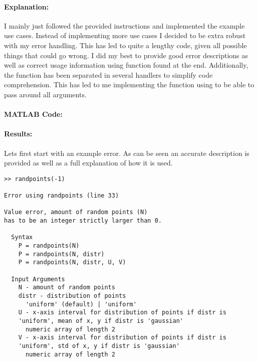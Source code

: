 
\paragraph{Explanation:}
I mainly just followed the provided instructions and implemented the example use cases.
Instead of implementing more use cases I decided to be extra robust with my error handling.
This has led to quite a lengthy code, given all possible things that could go wrong.
I did my best to provide good error descriptions as well as correct usage information using function  found at the end.
Additionally, the function has been separated in several handlers to simplify code comprehension.
This has led to me implementing the function using  to be able to pass around all arguments.

\paragraph{MATLAB Code:}

\begin{tiny}
    
\end{tiny}

\paragraph{Results:}
Lets first start with an example error.
As can be seen an accurate description is provided as well as a full explanation of how it is used.

\begin{verbatim}
>> randpoints(-1)

Error using randpoints (line 33)

Value error, amount of random points (N)
has to be an integer strictly larger than 0.

  Syntax
	P = randpoints(N)
	P = randpoints(N, distr)
	P = randpoints(N, distr, U, V)

  Input Arguments
	N - amount of random points
	distr - distribution of points
	  'uniform' (default) | 'uniform'
	U - x-axis interval for distribution of points if distr is
	'uniform', mean of x, y if distr is 'gaussian'
	  numeric array of length 2
	V - x-axis interval for distribution of points if distr is
	'uniform', std of x, y if distr is 'gaussian'
	  numeric array of length 2
\end{verbatim}

